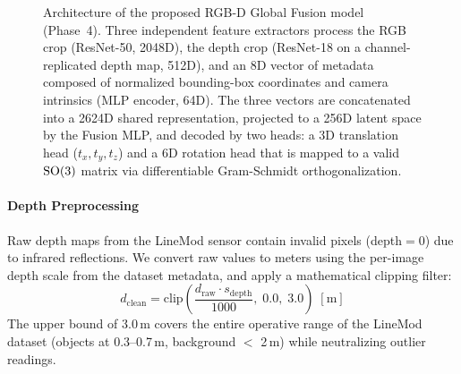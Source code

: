 \begin{figure}[t]
{%
    }
    \caption{Architecture of the proposed RGB-D Global Fusion model (Phase~4). Three independent feature extractors process the RGB crop (ResNet-50, 2048D), the depth crop (ResNet-18 on a channel-replicated depth map, 512D), and an 8D vector of metadata composed of normalized bounding-box coordinates and camera intrinsics (MLP encoder, 64D). The three vectors are concatenated into a 2624D shared representation, projected to a 256D latent space by the Fusion MLP, and decoded by two heads: a 3D translation head ($t_x, t_y, t_z$) and a 6D rotation head that is mapped to a valid $\mathrm{SO}(3)$ matrix via differentiable Gram-Schmidt orthogonalization.}
    \label{fig:architecture}
\end{figure}

\paragraph{Depth Preprocessing}
Raw depth maps from the LineMod sensor contain invalid pixels (depth$=$0) due to infrared reflections. We convert raw values to meters using the per-image depth scale from the dataset metadata, and apply a mathematical clipping filter:
\begin{equation}
    d_{\text{clean}} = \text{clip}\left(\frac{d_{\text{raw}} \cdot s_{\text{depth}}}{1000}, \; 0.0, \; 3.0\right) \; [\text{m}]
    \label{eq:depth_clip}
\end{equation}
The upper bound of 3.0\,m covers the entire operative range of the LineMod dataset (objects at 0.3--0.7\,m, background $<$ 2\,m) while neutralizing outlier readings.

